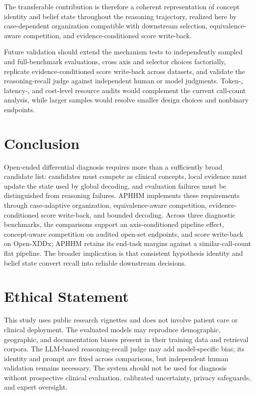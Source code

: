 \documentclass[letterpaper]{article} %
\begin{document}
The transferable contribution is therefore a coherent representation of concept identity and belief state throughout the reasoning trajectory, realized here by case-dependent organization compatible with downstream selection, equivalence-aware competition, and evidence-conditioned score write-back.

Future validation should extend the mechanism tests to independently sampled and full-benchmark evaluations, cross axis and selector choices factorially, replicate evidence-conditioned score write-back across datasets, and validate the reasoning-recall judge against independent human or model judgments.
Token-, latency-, and cost-level resource audits would complement the current call-count analysis, while larger samples would resolve smaller design choices and nonbinary endpoints.

\section{Conclusion}
\label{sec:conclusion}

Open-ended differential diagnosis requires more than a sufficiently broad candidate list: candidates must compete as clinical concepts, local evidence must update the state used by global decoding, and evaluation failures must be distinguished from reasoning failures.
APHHM implements these requirements through case-adaptive organization, equivalence-aware competition, evidence-conditioned score write-back, and bounded decoding.
Across three diagnostic benchmarks, the comparisons support an axis-conditioned pipeline effect, concept-aware competition on audited open-set endpoints, and score write-back on Open-XDDx; APHHM retains its end-task margins against a similar-call-count flat pipeline.
The broader implication is that consistent hypothesis identity and belief state convert recall into reliable downstream decisions.
%
\section*{Ethical Statement}

This study uses public research vignettes and does not involve patient care or clinical deployment.
The evaluated models may reproduce demographic, geographic, and documentation biases present in their training data and retrieval corpora.
The LLM-based reasoning-recall judge may add model-specific bias; its identity and prompt are fixed across comparisons, but independent human validation remains necessary.
The system should not be used for diagnosis without prospective clinical evaluation, calibrated uncertainty, privacy safeguards, and expert oversight.
 

\end{document}
